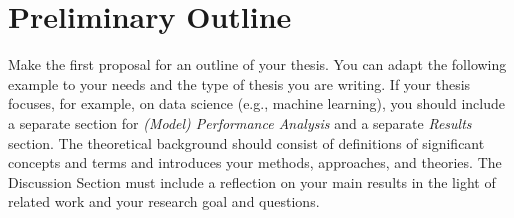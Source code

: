 \section{Preliminary Outline}
\label{sec:outline}
Make the first proposal for an outline of your thesis. You can adapt the following example to your needs and the type of thesis you are writing. If your thesis focuses, for example, on data science (e.g., machine learning), you should include a separate section for \emph{(Model) Performance Analysis} and a separate \emph{Results} section. The theoretical background should consist of definitions of significant concepts and terms and introduces your methods, approaches, and theories. The Discussion Section must include a reflection on your main results in the light of related work and your research goal and questions.

